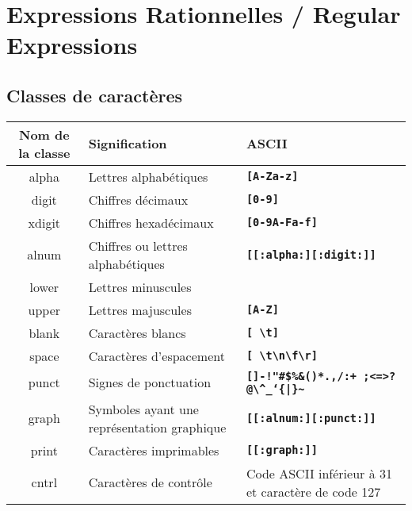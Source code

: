 \documentclass[11pt,a4paper]{article}
\author{Fabrice BOISSIER}
\newcommand{\TTBF}[1]{\texttt{\textbf{#1}}}	%
\begin{document}
\section{Expressions Rationnelles / Regular Expressions}

\bigskip

\subsection{Classes de caractères}

\bigskip


\begin{center}
	\begin{tabular}{ c | M{4cm} | M{7cm} }
  \textbf{Nom de la classe} & \textbf{Signification} & \textbf{ASCII} \\  \hline
	alpha & Lettres alphabétiques & \TTBF{[A-Za-z]} \\ \hline
	digit & Chiffres décimaux & \TTBF{[0-9]} \\ \hline
	xdigit & Chiffres hexadécimaux & \TTBF{[0-9A-Fa-f]} \\ \hline
	alnum & Chiffres ou lettres alphabétiques & \TTBF{[[:alpha:][:digit:]]} \\ \hline
	lower & Lettres minuscules & \TTBF{\textquotesingle[a-z]\textquotesingle} \\ \hline
	upper & Lettres majuscules & \TTBF{[A-Z]} \\ \hline
	blank & Caractères blancs & \TTBF{[ \textbackslash t]} \\ \hline
	space & Caractères d'espacement & \TTBF{[ \textbackslash t\textbackslash n\textbackslash f\textbackslash r]} \\ \hline
	punct & Signes de ponctuation &  \TTBF{[]-!"\#\$\%\&\textquotesingle ()*.,/:+ ;<=>?@\textbackslash \textasciicircum \_\lq \{|\}\textasciitilde } \\ \hline
	graph & Symboles ayant une représentation graphique & \TTBF{[[:alnum:][:punct:]]} \\ \hline
	print & Caractères imprimables & \TTBF{[[:graph:]]} \\ \hline
	cntrl & Caractères de contrôle & Code ASCII inférieur à 31 et caractère de code 127 \\
	\end{tabular}
\end{center}

\end{document}
